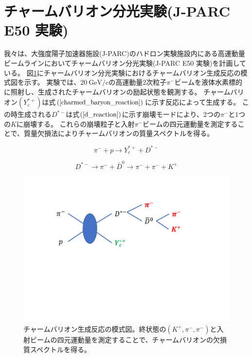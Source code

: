 \section{チャームバリオン分光実験(J-PARC E50 実験)}
我々は、大強度陽子加速器施設(J-PARC)のハドロン実験施設内にある高運動量ビームラインにおいてチャームバリオン分光実験(J-PARC E50 実験)を計画している。
図\ref{charmed_baryon_generation}にチャームバリオン分光実験におけるチャームバリオン生成反応の模式図を示す。
実験では、$\SI{20}{\GeV / c}$の高運動量2次粒子$\pi^-$ビームを液体水素標的に照射し、生成されたチャームバリオンの励起状態を観測する。
チャームバリオン$(Y_c^{*+})$は式$(\ref{charmed_baryon_reaction})$に示す反応によって生成する。
この時生成される$D^{*-}$は式$(\ref{d_reaction})$に示す崩壊モードにより、2つの$\pi^-$と1つの$K$に崩壊する。
これらの崩壊粒子と入射$\pi^-$ビームの四元運動量を測定することで、質量欠損法によりチャームバリオンの質量スペクトルを得る。

\begin{equation}
  \label{charmed_baryon_reaction}
  \pi^- + p \rightarrow Y_c^{*+} + D^{*-}
\end{equation}

\begin{equation}
  \label{d_reaction}
  D^{*-} \rightarrow \pi^- + \bar{D}^0 \rightarrow \pi^- + \pi^- + K^+
\end{equation}

\begin{figure}[htbp]
  \label{charmed_baryon_generation}
  \centering
  \includegraphics[width=15cm]{images/chapter1/charmed_baryon_generation.pdf}
  \caption{チャームバリオン生成反応の模式図。終状態の$(K^+,\pi^-,\pi^-)$と入射ビームの四元運動量を測定することで、チャームバリオンの欠損質スペクトルを得る。}
\end{figure}